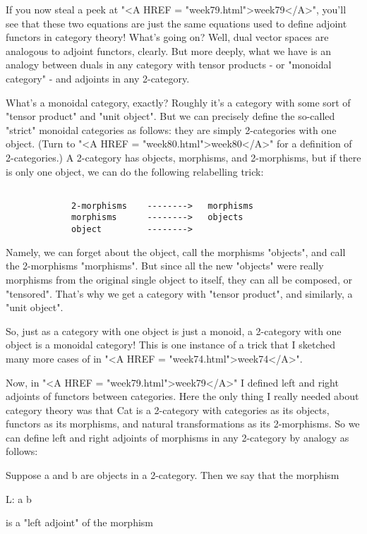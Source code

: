 If you now steal a peek at "<A HREF = "week79.html">week79</A>", you'll see that these two equations
are just the same equations used to define adjoint functors in category
theory!  What's going on?  Well, dual vector spaces are analogous to
adjoint functors, clearly.  But more deeply, what we have is an analogy
between duals in any category with tensor products - or "monoidal
category" - and adjoints in any 2-category.

What's a monoidal category, exactly?  Roughly it's a category with some
sort of "tensor product" and "unit object".  But we can precisely define
the so-called "strict" monoidal categories as follows: they are simply
2-categories with one object.  (Turn to "<A HREF = "week80.html">week80</A>" for a definition of
2-categories.)   A 2-category has objects, morphisms, and 2-morphisms,
but if there is only one object, we can do the following relabelling
trick: 


\begin{verbatim}

             2-morphisms    -------->   morphisms
             morphisms      -------->   objects
             object         -------->   
\end{verbatim}
    

Namely, we can forget about the object, call the morphisms
"objects", and call the 2-morphisms "morphisms".
But since all the new "objects" were really morphisms from the
original single object to itself, they can all be composed, or
"tensored".  That's why we get a category with "tensor
product", and similarly, a "unit object".

So, just as a category with one object is just a monoid, a 2-category
with one object is a monoidal category!  This is one instance of a trick
that I sketched many more cases of in "<A HREF = "week74.html">week74</A>".

Now, in "<A HREF = "week79.html">week79</A>" I defined left and right adjoints of functors between
categories.  Here the only thing I really needed about category
theory was that Cat is a 2-category with categories as its objects,
functors as its morphisms, and natural transformations as its
2-morphisms.  So we can define left and right adjoints of morphisms in
any 2-category by analogy as follows:

Suppose a and b are objects in a 2-category.  Then we say that the morphism

L: a \to  b

is a "left adjoint" of the morphism

